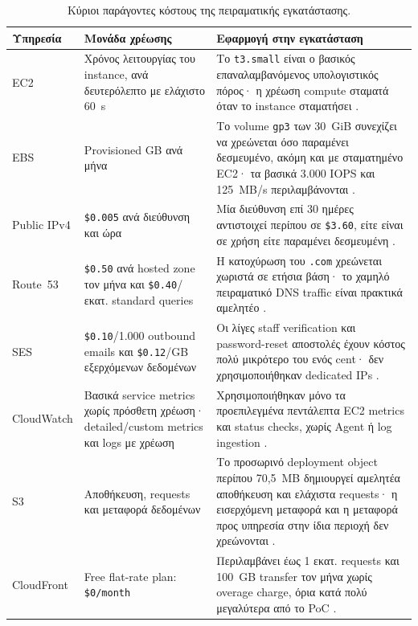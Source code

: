 \begin{table}[htbp]
\centering
\caption{Κύριοι παράγοντες κόστους της πειραματικής εγκατάστασης.}
\label{tab:aws-cost-drivers}
\small
\begin{tabularx}{\textwidth}{p{}p{}X}
\toprule
Υπηρεσία & Μονάδα χρέωσης & Εφαρμογή στην εγκατάσταση \\
\midrule
EC2 & Χρόνος λειτουργίας του instance, ανά δευτερόλεπτο με ελάχιστο 60~s & Το \texttt{t3.small} είναι ο βασικός επαναλαμβανόμενος υπολογιστικός πόρος· η χρέωση compute σταματά όταν το instance σταματήσει \cite{aws2026ec2pricing}. \\
EBS & Provisioned GB ανά μήνα & Το volume \texttt{gp3} των 30~GiB συνεχίζει να χρεώνεται όσο παραμένει δεσμευμένο, ακόμη και με σταματημένο EC2· τα βασικά 3.000 IOPS και 125~MB/s περιλαμβάνονται \cite{aws2026ebspricing}. \\
Public IPv4 & \texttt{\$0.005} ανά διεύθυνση και ώρα & Μία διεύθυνση επί 30 ημέρες αντιστοιχεί περίπου σε \texttt{\$3.60}, είτε είναι σε χρήση είτε παραμένει δεσμευμένη \cite{aws2026vpcpricing}. \\
Route~53 & \texttt{\$0.50} ανά hosted zone τον μήνα και \texttt{\$0.40}/εκατ. standard queries & Η κατοχύρωση του \texttt{.com} χρεώνεται χωριστά σε ετήσια βάση· το χαμηλό πειραματικό DNS traffic είναι πρακτικά αμελητέο \cite{aws2026route53pricing}. \\
SES & \texttt{\$0.10}/1.000 outbound emails και \texttt{\$0.12}/GB εξερχόμενων δεδομένων & Οι λίγες staff verification και password-reset αποστολές έχουν κόστος πολύ μικρότερο του ενός cent· δεν χρησιμοποιήθηκαν dedicated IPs \cite{aws2026sespricing}. \\
CloudWatch & Βασικά service metrics χωρίς πρόσθετη χρέωση· detailed/custom metrics και logs με χρέωση & Χρησιμοποιήθηκαν μόνο τα προεπιλεγμένα πεντάλεπτα EC2 metrics και status checks, χωρίς Agent ή log ingestion \cite{aws2026cloudwatchbasic}. \\
S3 & Αποθήκευση, requests και μεταφορά δεδομένων & Το προσωρινό deployment object περίπου 70,5~MB δημιουργεί αμελητέα αποθήκευση και ελάχιστα requests· η εισερχόμενη μεταφορά και η μεταφορά προς υπηρεσία στην ίδια περιοχή δεν χρεώνονται \cite{aws2026s3pricing}. \\
CloudFront & Free flat-rate plan: \texttt{\$0/month} & Περιλαμβάνει έως 1 εκατ. requests και 100~GB transfer τον μήνα χωρίς overage charge, όρια κατά πολύ μεγαλύτερα από το PoC \cite{aws2026cloudfrontplans}. \\
\bottomrule
\end{tabularx}
\end{table}

